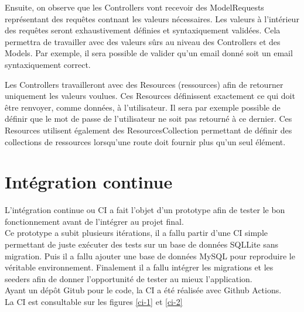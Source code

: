 \documentclass[
    iai, %
    il, %
]{heig-tb}
\begin{document}
Ensuite, on observe que les Controllers vont recevoir des ModelRequests représentant des requêtes
contnant les valeurs nécessaires. Les valeurs à l'intérieur des requêtes seront exhaustivement
définies et syntaxiquement validées. Cela permettra de travailler avec des valeurs sûrs au niveau
des Controllers et des Models. Par exemple, il sera possible de valider qu'un email donné soit un
email syntaxiquement correct.

Les Controllers travailleront avec des Resources (ressources) afin de retourner uniquement les
valeurs voulues. Ces Resources définissent exactement ce qui doit être renvoyer, comme données, à
l'utilisateur. Il sera par exemple possible de définir que le mot de passe de l'utilisateur ne soit
pas retourné à ce dernier. Ces Resources utilisent également des ResourcesCollection permettant de
définir des collections de ressources lorsqu'une route doit fournir plus qu'un seul élément.







\chapter{Intégration continue}
L'intégration continue ou CI a fait l'objet d'un prototype afin de tester le bon fonctionnement
avant de l'intégrer au projet final.\\
Ce prototype a subit plusieurs itérations, il a fallu partir d'une CI simple permettant de juste
exécuter des tests sur un base de données SQLLite sans migration. Puis il a fallu ajouter une base
de données MySQL pour reproduire le véritable environnement. Finalement il a fallu intégrer les
migrations et les seeders afin de donner l'opportunité de tester au mieux l'application.\\
Ayant un dépôt Gitub pour le code, la CI a été réalisée avec Github Actions.\\
La CI est consultable sur les figures \ref{ci-1} et \ref{ci-2}
\end{document}
